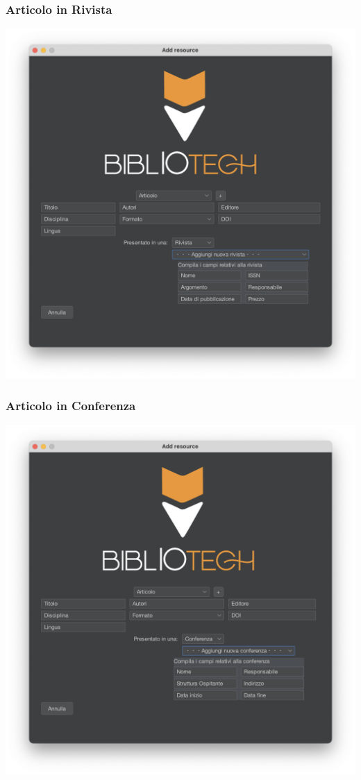 \subsubsection{Articolo in Rivista}
\includegraphics[scale=0.25, center]{Immagini/Schermate/Insert/InserisciRisorsaPage-ArticoloRivista.png}
\subsubsection{Articolo in Conferenza}
\includegraphics[scale=0.25, center]{Immagini/Schermate/Insert/InserisciRisorsaPage-ArticoliConferenza.png}

